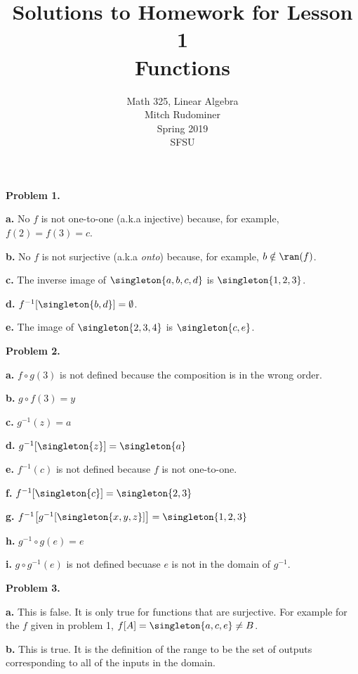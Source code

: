 \documentclass[oneside,12pt]{amsart}
\begin{document}
\title{Solutions to Homework for Lesson 1 \\ Functions}
\author{Math 325, Linear Algebra \\ Mitch Rudominer \\ Spring 2019 \\ SFSU }
\date{}

\maketitle


\textbf{Problem 1.}

\textbf{a.} No $f$ is not one-to-one (a.k.a injective) because, for example,
$f(2) = f(3) = c$.

\textbf{b.} No $f$ is not surjective (a.k.a \emph{onto}) because, for example,
$b\notin\ran(f)$.

\textbf{c.} The inverse image of $\singleton{a,b,c,d}$ is $\singleton{1,2,3}$.

\textbf{d.} $f^{-1}[\singleton{b, d}] = \emptyset$.


\textbf{e.} The image of $\singleton{2,3,4}$ is $\singleton{c, e}$.

\medskip

\textbf{Problem 2.}

\textbf{a.} $f\circ g (3)$ is not defined because the composition is in the wrong order.

\textbf{b.} $g\circ f (3) = y$


\textbf{c.} $g^{-1}(z) = a$


\textbf{d.} $g^{-1}[\singleton{z}] = \singleton{a}$


\textbf{e.} $f^{-1}(c)$ is not defined because $f$ is not one-to-one.


\textbf{f.} $f^{-1}[\singleton{c}] = \singleton{2,3}$


\textbf{g.} $f^{-1}\big[g^{-1}[\singleton{x, y, z}]\big] = \singleton{1,2,3}$


\textbf{h.} $g^{-1} \circ g (e) = e$

\textbf{i.} $g \circ g^{-1} (e)$ is not defined becuase $e$ is not in the domain of $g^{-1}$.

\medskip

\textbf{Problem 3.}

\textbf{a.} This is false. It is only true for functions that are surjective.
For example for the $f$ given in problem 1,  $f[A] = \singleton{a,c,e} \not= B$.

\textbf{b.} This is true. It is the definition of the range to be the set of
outputs corresponding to all of the inputs in the domain.
\end{document}
